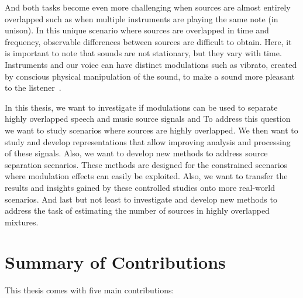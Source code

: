 And both tasks become even more challenging when sources are almost entirely overlapped such as when multiple instruments are playing the same note (in unison).
In this unique scenario where sources are overlapped in time and frequency, observable differences between sources are difficult to obtain.
Here, it is important to note that sounds are not stationary, but they vary with time.
Instruments and our voice can have distinct modulations such as vibrato, created by conscious physical manipulation of the sound, to make a sound more pleasant to the listener~\cite{fletcher01}.
\par
In this thesis, we want to investigate if modulations can be used to separate highly overlapped speech and music source signals and
To address this question we want to study scenarios where sources are highly overlapped.
We then want to study and develop representations that allow improving analysis and processing of these signals.
Also, we want to develop new methods to address source separation scenarios.
These methods are designed for the constrained scenarios where modulation effects can easily be exploited.
Also, we want to transfer the results and insights gained by these controlled studies onto more real-world scenarios.
And last but not least to investigate and develop new methods to address the task of estimating the number of sources in highly overlapped mixtures.



\section{Summary of Contributions}

This thesis comes with five main contributions:

